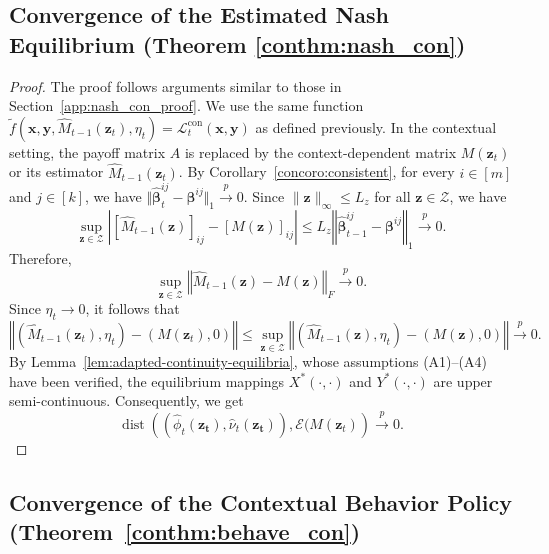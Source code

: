 \documentclass[12pt]{article}
\begin{document}
\subsection{Convergence of the Estimated Nash Equilibrium (Theorem \ref{conthm:nash_con})}
\label{app:conthm:nash_con_proof}

\begin{proof}
The proof follows arguments similar to those in
Section~\ref{app:nash_con_proof}. We use the same function $\widetilde{f}(\bm x,\bm y,\widehat M_{t-1}(\bm z_t),\eta_t) = \mathcal L_t^{\mathrm{con}}(\bm x,\bm y)$
as defined previously. In the contextual setting, the payoff matrix $A$ is replaced by the context-dependent matrix $M(\bm z_t)$ or its estimator $\widehat M_{t-1}(\bm z_t)$. By Corollary~\ref{concoro:consistent}, for every $i\in[m]$ and
$j\in[k]$, we have $\Vert \widehat{\bm\beta}_{t}^{ij}-\bm\beta^{ij} \Vert_1 \stackrel{p} {\to}0$. Since $\|\bm z\|_\infty\le L_z$ for all $\bm z\in\mathcal Z$, we have
\[
\sup_{\bm z\in\mathcal Z}
\left|
[\widehat M_{t-1}(\bm z)]_{ij}
-
[M(\bm z)]_{ij}
\right|
\le
L_z
\left\Vert
\widehat{\bm\beta}_{t-1}^{ij}-\bm\beta^{ij}
\right\Vert_1
\stackrel{p}{\to}0.
\]
Therefore,
\[
\sup_{\bm z\in\mathcal Z}
\left\Vert
\widehat M_{t-1}(\bm z)-M(\bm z)
\right\Vert_F
\stackrel{p}{\to}0.
\]
Since $\eta_t\to0$, it follows that
\[
\left\Vert
\left(\widehat M_{t-1}(\bm z_t),\eta_t\right)
- \left(M(\bm z_t),0\right)
\right\Vert \le 
\sup_{\bm z\in\mathcal Z}
\left\Vert
\left(\widehat M_{t-1}(\bm z),\eta_t\right)
- \left(M(\bm z),0\right)
\right\Vert
\stackrel{p}{\to}0.
\]
By Lemma~\ref{lem:adapted-continuity-equilibria}, whose assumptions
(A1)--(A4) have been verified, the equilibrium mappings $X^\ast(\cdot,\cdot)$ and
$Y^\ast(\cdot,\cdot)$ are upper semi-continuous.
Consequently, we get 
$$
\operatorname{dist} \left( (\widehat{\phi}_t(\bm{z_t}), \widehat{\nu}_t(\bm{z_t})),\mathcal{E}(M(\bm{z}_t) \right) \stackrel{p}{\to} 0.
$$
\end{proof}


\subsection{Convergence of the Contextual Behavior Policy (Theorem~\ref{conthm:behave_con})}
\label{app:conthm:nash_behave_proof}
\end{document}

